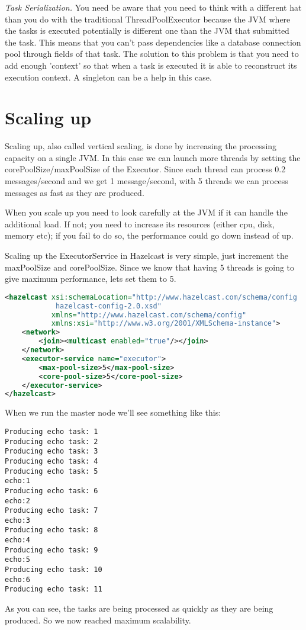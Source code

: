 \emph{Task Serialization.} You need be aware that you need to think with a different hat than you do with the traditional ThreadPoolExecutor because the JVM where the tasks is executed potentially is different one than the JVM that submitted the task. This means that you can't pass dependencies like a database connection pool through fields of that task. The solution to this problem is that you need to add enough 'context' so that when a task is executed it is able to reconstruct its execution context. A singleton can be a help in this case.

\section{Scaling up}
Scaling up, also called vertical scaling, is done by increasing the processing capacity on a single JVM. In this case we can launch more threads by setting the corePoolSize/maxPoolSize of the Executor. Since each thread can process 0.2 messages/second and we get 1 message/second, with 5 threads we can process messages as fast as they are produced.

When you scale up you need to look carefully at the JVM if it can handle the additional load. If not; you need to increase its resources (either cpu, disk, memory etc); if you fail to do so, the performance could go down instead of up. 

Scaling up the ExecutorService in Hazelcast is very simple, just increment the maxPoolSize and corePoolSize. Since we know that having 5 threads is going to give maximum performance, lets set them to 5.
\begin{lstlisting}[language=xml]
<hazelcast xsi:schemaLocation="http://www.hazelcast.com/schema/config
            hazelcast-config-2.0.xsd"
           xmlns="http://www.hazelcast.com/schema/config"
           xmlns:xsi="http://www.w3.org/2001/XMLSchema-instance">
    <network>
        <join><multicast enabled="true"/></join>
    </network>
    <executor-service name="executor">
        <max-pool-size>5</max-pool-size>
        <core-pool-size>5</core-pool-size>
    </executor-service>
</hazelcast>
\end{lstlisting}
When we run the master node we'll see something like this:
\begin{lstlisting}
Producing echo task: 1
Producing echo task: 2
Producing echo task: 3
Producing echo task: 4
Producing echo task: 5
echo:1
Producing echo task: 6
echo:2
Producing echo task: 7
echo:3
Producing echo task: 8
echo:4
Producing echo task: 9
echo:5
Producing echo task: 10
echo:6
Producing echo task: 11	
\end{lstlisting}
As you can see, the tasks are being processed as quickly as they are being produced. So we now reached maximum scalability.

